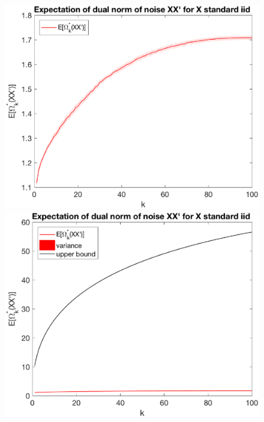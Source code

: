 \documentclass[12pt]{article}
\begin{document}
\begin{figure}[h]
    \begin{minipage}[c]{.4\linewidth}
        \centering
        \includegraphics[width=\linewidth]{Fig/dualnorm-noise.eps}
    \end{minipage}
    \hfill%
    \begin{minipage}[c]{.4\linewidth}
        \centering
        \includegraphics[width=\linewidth]{Fig/dualnorm-noise-ub.eps}
    \end{minipage}
\end{figure}
\end{document}
